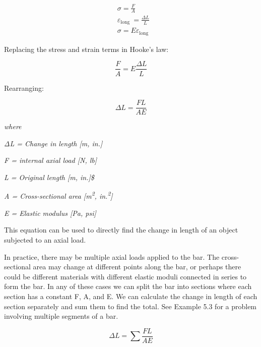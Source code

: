 \documentclass[
  letterpaper,
  DIV=11,
  numbers=noendperiod]{scrreprt}
\begin{document}
\[
\begin{aligned} & \sigma=\frac{F}{A} \\ & \varepsilon_{\text {long }}=\frac{\Delta L}{L} \\ & \sigma=E \varepsilon_{\text {long }}\end{aligned}\]

Replacing the stress and strain terms in Hooke's law:

\[
\frac{F}{A}=E \frac{\Delta L}{L}\]

Rearranging:

\[
\Delta L=\frac{F L}{A E}\]

\emph{where}

\emph{ΔL = Change in length {[}m, in.{]}}

\emph{F = internal axial load {[}N, lb{]}}

\emph{L = Original length {[}m, in.{]}\$}

\emph{A = Cross-sectional area {[}m\textsuperscript{2},
in.\textsuperscript{2}{]}}

\emph{E = Elastic modulus {[}Pa, psi{]}}

This equation can be used to directly find the change in length of an
object subjected to an axial load.

In practice, there may be multiple axial loads applied to the bar. The
cross-sectional area may change at different points along the bar, or
perhaps there could be different materials with different elastic moduli
connected in series to form the bar. In any of these cases we can split
the bar into sections where each section has a constant F, A, and E. We
can calculate the change in length of each section separately and sum
them to find the total. See Example 5.3 for a problem involving multiple
segments of a bar.

\[
\Delta L=\sum \frac{F L}{A E}\]
\end{document}
